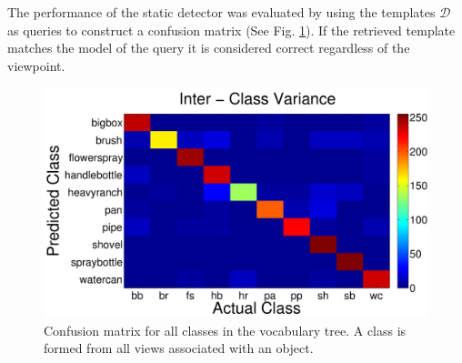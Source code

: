 The performance of the static detector was evaluated by using the templates $\mathcal{D}$ as queries to construct a confusion matrix (See Fig. \ref{fig:confusion_result}). If the retrieved template matches the model of the query it is considered correct regardless of the viewpoint.
\begin{figure}[htb]
	\includegraphics[width=\linewidth]{figs/interclass.pdf}
	\caption{Confusion matrix for all classes in the vocabulary tree. A class is formed from all views associated with an object.}
	\label{fig:confusion_result}
\end{figure}













